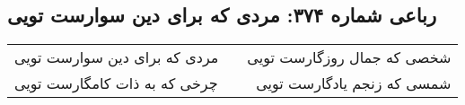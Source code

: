 \begin{center}
\section*{رباعی شماره ۳۷۴: مردی که برای دین سوارست تویی}
\label{sec:sh374}
\begin{longtable}{l p{0.5cm} r}
مردی که برای دین سوارست تویی
&&
شخصی که جمال روزگارست تویی
\\
چرخی که به ذات کامگارست تویی
&&
شمسی که زنجم یادگارست تویی
\\
\end{longtable}
\end{center}
